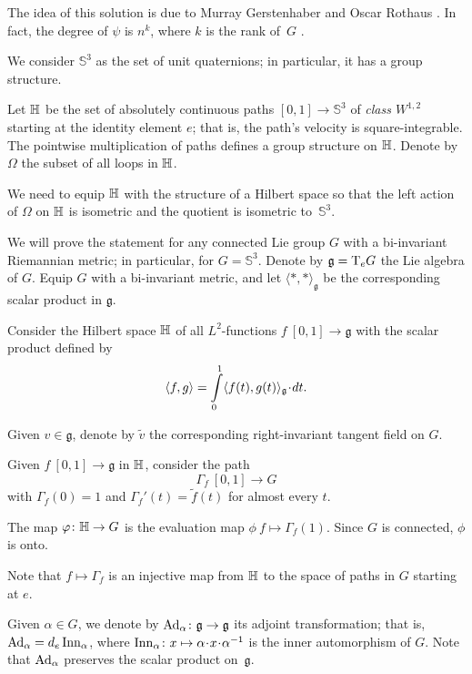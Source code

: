 The idea of this solution is due to Murray Gerstenhaber and Oscar Rothaus 
\cite{gerstenhaber-rothaus}.
In fact, the degree of $\psi$ is $n^k$, where $k$ is the rank of~$G$ \cite{hopf}.

We consider $\mathbb{S}^3$ as the set of unit quaternions;
in particular, it has a group structure.

Let $\mathbb{H}$ be the set of absolutely continuous paths $[0,1]\to\mathbb{S}^3$ of \emph{class $W^{1,2}$} starting at the identity element $e$;
that is, the path's velocity is square-integrable.
The pointwise multiplication of paths defines a group structure on $\mathbb{H}$.
Denote by $\Omega$ the subset of all loops in $\mathbb{H}$.

We need to equip $\mathbb{H}$ with the structure of a Hilbert space so that
the left action of $\Omega$ on $\mathbb{H}$ is isometric and the quotient is isometric to~$\mathbb{S}^3$.

\medskip

We will prove the statement for any connected Lie group $G$ with a bi-invariant Riemannian metric; in particular, for $G=\mathbb{S}^3$.
Denote by $\mathfrak{g}=\mathrm{T}_eG$ the Lie algebra of $G$.
Equip $G$ with a bi-invariant metric, and let $\langle{*},{*}\rangle_{\mathfrak{g}}$ be the corresponding scalar product in $\mathfrak{g}$.

Consider the Hilbert space $\mathbb{H}$ of all $L^2$-functions $f\:[0,1]\to\mathfrak{g}$ with the scalar product defined by
\[\<f,g\>=\int\limits_0^1\<f(t),g(t)\>_{\mathfrak{g}}\cdot dt.\]


Given $v\in \mathfrak{g}$, denote by $\tilde v$ the corresponding right-invariant tangent field on $G$.

Given $f\:[0,1]\to \mathfrak{g}$ in $\mathbb{H}$,
consider the path 
\[\Gamma_f\:[0,1]\to G\] 
with 
$\Gamma_f(0)=1$ and $\Gamma_f'(t)=\tilde f(t)$ for almost every $t$.

The map $\varphi\colon\mathbb{H}\to G$ is the evaluation map $\phi\:f\mapsto \Gamma_f(1)$.
Since $G$ is connected, $\phi$ is onto.

Note that $f\mapsto \Gamma_f$ is an injective map from $\mathbb{H}$ to the space of paths in $G$ starting at $e$.

Given $\alpha\in G$, we denote by $\mathrm{Ad}_\alpha\colon\mathfrak{g}\to \mathfrak{g}$ its adjoint transformation;
that is, $\mathrm{Ad}_\alpha=d_e\operatorname{\rm Inn}\nolimits_\alpha$, where $\Inn_\alpha\:x\mapsto \alpha\cdot x\cdot \alpha^{-1}$ is the inner automorphism of $G$.
Note that $\mathrm{Ad}_\alpha$ preserves the scalar product on~$\mathfrak{g}$.

